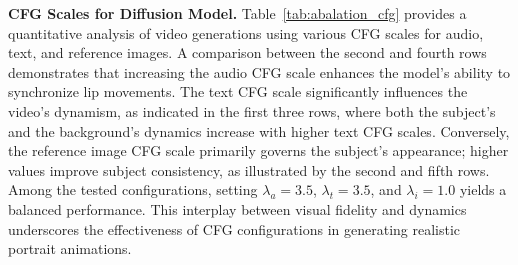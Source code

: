 

\noindent
\textbf{CFG Scales for Diffusion Model.}  
Table~\ref{tab:abalation_cfg} provides a quantitative analysis of video generations using various CFG scales for audio, text, and reference images. A comparison between the second and fourth rows demonstrates that increasing the audio CFG scale enhances the model's ability to synchronize lip movements. The text CFG scale significantly influences the video’s dynamism, as indicated in the first three rows, where both the subject's and the background's dynamics increase with higher text CFG scales. Conversely, the reference image CFG scale primarily governs the subject's appearance; higher values improve subject consistency, as illustrated by the second and fifth rows. Among the tested configurations, setting \(\lambda_a=3.5\), \(\lambda_t=3.5\), and \(\lambda_i=1.0\) yields a balanced performance. This interplay between visual fidelity and dynamics underscores the effectiveness of CFG configurations in generating realistic portrait animations.


